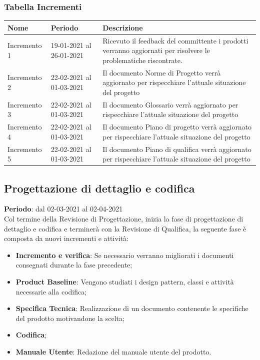 	\subsubsection{Tabella Incrementi}
		\begin{center}
    			\begin{tabular}{ | l | p{5cm} | p{8cm} |}
   			 \hline
    			Nome & Periodo & Descrizione \\ \hline
    			Incremento 1 & 19-01-2021 al 26-01-2021 & Ricevuto il feedback del committente i prodotti verranno aggiornati per risolvere le problematiche riscontrate. \\ \hline
    			Incremento 2 & 22-02-2021 al 01-03-2021 & Il documento Norme di Progetto verrà aggiornato per rispecchiare l'attuale situazione del progetto \\ \hline
    			Incremento 3 & 22-02-2021 al 01-03-2021 & Il documento Glossario verrà aggiornato per rispecchiare l'attuale situazione del progetto \\ \hline
			Incremento 4 & 22-02-2021 al 01-03-2021 & Il documento Piano di progetto verrà aggiornato per rispecchiare l'attuale situazione del progetto \\ \hline
			Incremento 5 & 22-02-2021 al 01-03-2021 & Il documento Piano di qualifica verrà aggiornato per rispecchiare l'attuale situazione del progetto \\ \hline
    			\end{tabular}
		\end{center}
	
	\subsection{Progettazione di dettaglio e codifica}
	\textbf{Periodo}: dal 02-03-2021 al 02-04-2021 \\
	Col termine della Revisione di Progettazione, inizia la fase di progettazione di dettaglio e codifica e terminerà con la Revisione di Qualifica, la seguente fase è composta da nuovi incrementi e attività:
	\begin{itemize}
		\item \textbf{Incremento e verifica}: Se necessario verranno migliorati i documenti consegnati durante la fase precedente;
		\item \textbf{Product Baseline}: Vengono studiati i design pattern, classi e attività necessarie alla codifica;
		\item \textbf{Specifica Tecnica}: Realizzazione di un documento contenente le specifiche del prodotto motivandone la scelta;
		\item \textbf{Codifica};
		\item \textbf{Manuale Utente}: Redazione del manuale utente del prodotto.
	\end{itemize}
	
